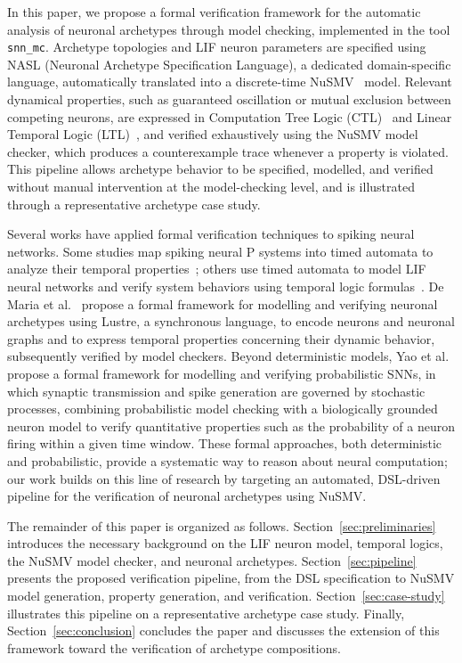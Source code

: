 \documentclass[
]{ceurart}
\begin{document}
In this paper, we propose a formal verification framework for the automatic
analysis of neuronal archetypes through model checking, implemented in the
tool \texttt{snn\_mc}. Archetype topologies and LIF neuron parameters are
specified using \textsc{NASL} (Neuronal Archetype Specification Language),
a dedicated domain-specific language, automatically translated into a
discrete-time NuSMV~\cite{Cimatti1999} model. Relevant dynamical
properties, such as guaranteed oscillation or mutual exclusion between
competing neurons, are expressed in Computation Tree Logic
(CTL)~\cite{Clarke1986} and Linear Temporal Logic (LTL)~\cite{Pnueli1977},
and verified exhaustively using the NuSMV model checker, which produces a
counterexample trace whenever a property is violated. This pipeline allows
archetype behavior to be specified, modelled, and verified without manual
intervention at the model-checking level, and is illustrated through a
representative archetype case study.

Several works have applied formal verification techniques to spiking neural
networks. Some studies map spiking neural P systems into timed automata to
analyze their temporal properties~\cite{Aman2016}; others use timed
automata to model LIF neural networks and verify system behaviors using
temporal logic formulas~\cite{DeMaria2018}. De Maria et
al.~\cite{DeMaria2020} propose a formal framework for modelling and verifying
neuronal archetypes using Lustre, a synchronous language, to encode neurons
and neuronal graphs and to express temporal properties concerning their
dynamic behavior, subsequently verified by model checkers. Beyond
deterministic models, Yao et al.~\cite{yao2023probabilistic} propose a formal framework
for modelling and verifying probabilistic SNNs, in which synaptic
transmission and spike generation are governed by stochastic processes,
combining probabilistic model checking with a biologically grounded neuron
model to verify quantitative properties such as the probability of a neuron
firing within a given time window. These formal approaches, both
deterministic and probabilistic, provide a systematic way to reason about
neural computation; our work builds on this line of research by targeting an
automated, DSL-driven pipeline for the verification of neuronal archetypes
using NuSMV.

The remainder of this paper is organized as follows. Section~\ref{sec:preliminaries}
introduces the necessary background on the LIF neuron model, temporal logics,
the NuSMV model checker, and neuronal archetypes. Section~\ref{sec:pipeline}
presents the proposed verification pipeline, from the DSL specification to
NuSMV model generation, property generation, and verification.
Section~\ref{sec:case-study} illustrates this pipeline on a representative
archetype case study. Finally, Section~\ref{sec:conclusion} concludes the
paper and discusses the extension of this framework toward the verification
of archetype compositions.
\end{document}
